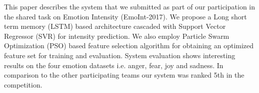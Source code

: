 This paper describes the system that we submitted as part of our participation in the shared task on Emotion Intensity (EmoInt-2017). We propose a Long short term memory (LSTM) based architecture cascaded with Support Vector Regressor (SVR) for intensity prediction. We also employ Particle Swarm Optimization (PSO) based feature selection algorithm for obtaining an optimized feature set for training and evaluation. System evaluation shows interesting results on the four emotion datasets i.e. anger, fear, joy and sadness. In comparison to the other participating teams our system was ranked 5th in the competition.
